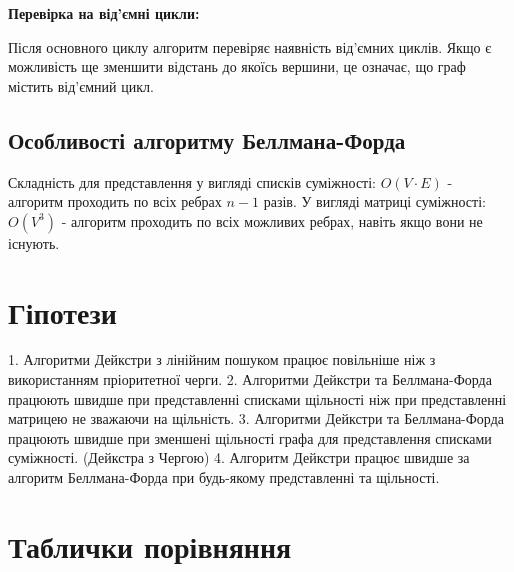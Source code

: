 \documentclass[a4paper,12pt]{article}
\begin{document}
\textbf{Перевірка на від'ємні цикли:}

Після основного циклу алгоритм перевіряє наявність від'ємних циклів. Якщо є можливість ще зменшити відстань до якоїсь вершини, це означає, що граф містить від'ємний цикл.

\subsection{Особливості алгоритму Беллмана-Форда}
Складність для представлення у вигляді списків суміжності: $O(V \cdot E)$ - алгоритм проходить по всіх ребрах $n-1$ разів.  
У вигляді матриці суміжності: $O(V^3)$ - алгоритм проходить по всіх можливих ребрах, навіть якщо вони не існують.

\section{Гіпотези}
1. Алгоритми Дейкстри з лінійним пошуком працює повільніше ніж з використанням пріоритетної черги.
2. Алгоритми Дейкстри та Беллмана-Форда працюють швидше при представленні списками щільності ніж при представленні матрицею не зважаючи на щільність.
3. Алгоритми Дейкстри та Беллмана-Форда працюють швидше при зменшені щільності графа для представлення списками суміжності. (Дейкстра з Чергою)
4. Алгоритм Дейкстри працює швидше за алгоритм Беллмана-Форда при будь-якому представленні та щільності.

\section{Таблички порівняння}
\end{document}
